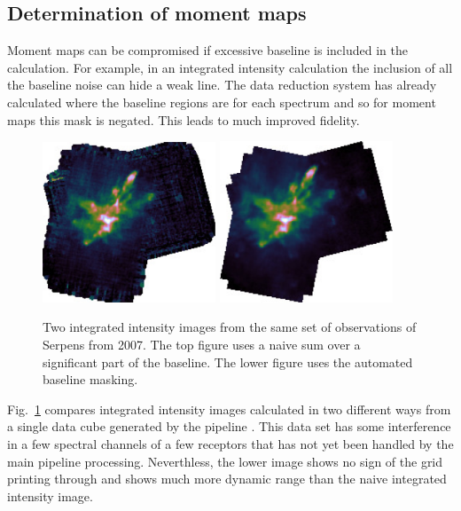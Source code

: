 \documentclass[final,authoryear,5p,times,twocolumn]{elsarticle}
\begin{document}
\subsection{Determination of moment maps}

Moment maps can be compromised if excessive baseline is included in
the calculation. For example, in an integrated intensity calculation
the inclusion of all the baseline noise can hide a weak line. The data
reduction system has already calculated where the baseline regions are
for each spectrum and so for moment maps this mask is negated. This
leads to much improved fidelity.

\begin{figure}
\includegraphics[width=0.46\textwidth]{integ_manual.pdf}
\includegraphics[width=0.46\textwidth]{integ_auto.pdf}
\caption{Two integrated intensity images from the same set of
  observations of Serpens from 2007. The top figure uses a naive sum
  over a significant part of the baseline. The lower figure uses the
  automated baseline masking.}
\label{fig:integ}
\end{figure}

Fig.\ \ref{fig:integ} compares integrated intensity images calculated
in two different ways from a single data cube generated by the
pipeline \citep[see][for details of earlier
reductions of these data]{2010MNRAS.409.1412G,2010A&A...523A..29D}. This data set
has some interference in a few spectral channels of a few receptors
that has not yet been handled by the main pipeline
processing. Neverthless, the lower image shows no sign of the grid
printing through and shows much more dynamic range than the naive
integrated intensity image.
\end{document}
